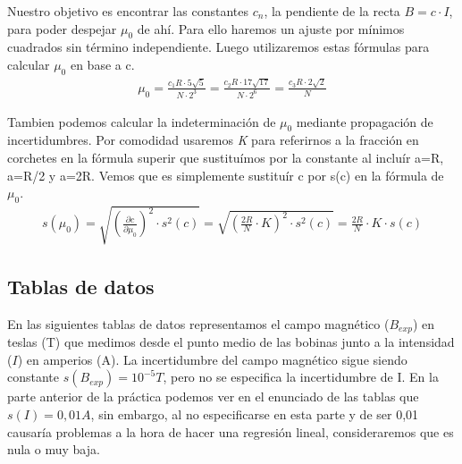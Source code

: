 \documentclass[12pt, a4paper, titlepage]{article}
\begin{document}
  Nuestro objetivo es encontrar las constantes $c_n$, la pendiente de la recta $B = c \cdot I$, para poder despejar $\mu_0$ de ahí. Para ello haremos un ajuste por mínimos cuadrados sin término independiente. Luego utilizaremos estas fórmulas para calcular $\mu_0$ en base a c.
  \begin{gather}
    \mu_0 = \frac{c_1 R \cdot 5 \sqrt{5}}{N \cdot 2^3} = \frac{c_2 R \cdot 17 \sqrt{17}}{N \cdot 2^6} = \frac{c_3 R \cdot 2 \sqrt{2}}{N} \label{ec:mu}
  \end{gather}

  Tambien podemos calcular la indeterminación de $\mu_0$ mediante propagación de incertidumbres. Por comodidad usaremos \textit{K} para referirnos a la fracción en corchetes en la fórmula superir que sustituímos por la constante al incluír a=R, a=R/2 y a=2R. Vemos que es simplemente sustituír c por s(c) en la fórmula de $\mu_0$.
  \begin{gather}
    s(\mu_0) = \sqrt{\left(\frac{\partial c}{\partial \mu_0} \right)^2 \cdot s^2(c)} = \sqrt{\left( \frac{2R}{N} \cdot K \right)^2 \cdot s^2(c)} = \frac{2R}{N} \cdot K \cdot s(c) \label{ec:smu}
  \end{gather}

  \newpage
  \subsection{Tablas de datos}

  En las siguientes tablas de datos representamos el campo magnético ($B_{exp}$) en teslas (T) que medimos desde el punto medio de las bobinas junto a la intensidad ($I$) en amperios (A). La incertidumbre del campo magnético sigue siendo constante $s(B_{exp}) = 10^{-5}T$, pero no se especifica la incertidumbre de I. En la parte anterior de la práctica podemos ver en el enunciado de las tablas que $s(I) = 0,01A$, sin embargo, al no especificarse en esta parte y de ser 0,01 causaría problemas a la hora de hacer una regresión lineal, consideraremos que es nula o muy baja.
\end{document}
